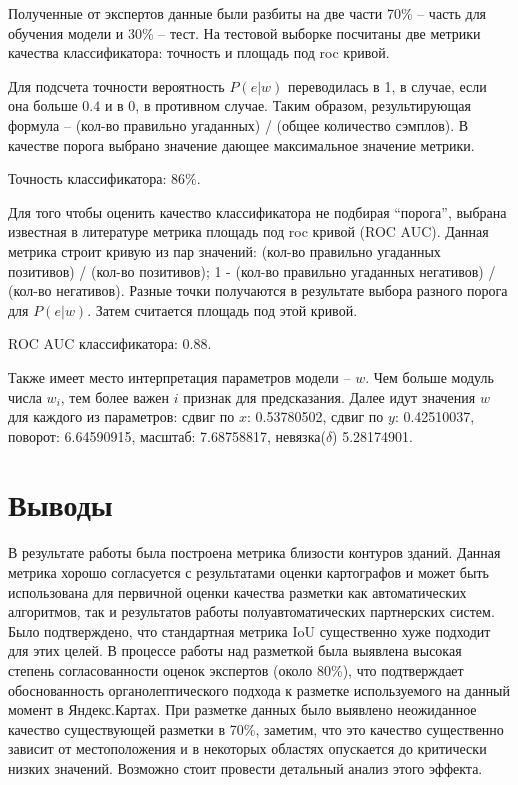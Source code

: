 \documentclass[12pt]{article}
\begin{document}
Полученные от экспертов данные были разбиты на две части 70\% -- часть для обучения модели и 30\% -- тест. На тестовой выборке посчитаны две метрики качества классификатора: точность и площадь под roc кривой.

Для подсчета точности вероятность $P(e | w)$ переводилась в 1, в случае, если она больше $0.4$ и в 0, в противном случае. Таким образом, результирующая формула -- (кол-во правильно угаданных) / (общее количество сэмплов). В качестве порога выбрано значение дающее максимальное значение метрики.

Точность классификатора: 86\%.

Для того чтобы оценить качество классификатора не подбирая ``порога'', выбрана известная в литературе метрика площадь под roc кривой (ROC AUC). Данная метрика строит кривую из пар значений: (кол-во правильно угаданных позитивов)  / (кол-во позитивов); 1 - (кол-во правильно угаданных негативов) / (кол-во негативов). Разные точки получаются в результате выбора разного порога для $P(e | w)$. Затем считается площадь под этой кривой.

ROC AUC классификатора: 0.88.

Также имеет место интерпретация параметров модели -- $w$. Чем больше модуль числа $w_i$, тем более важен $i$ признак для предсказания. Далее идут значения $w$ для каждого из параметров:
сдвиг по $x$: 0.53780502, сдвиг по $y$: 0.42510037, поворот: 6.64590915, масштаб: 7.68758817, невязка($\delta$) 5.28174901.

\section{Выводы}
\label{conclusions}
В результате работы была построена метрика близости контуров зданий. Данная метрика хорошо согласуется с результатами оценки картографов и может быть использована для первичной оценки качества разметки как автоматических алгоритмов, так и результатов работы полуавтоматических партнерских систем. Было подтверждено, что стандартная метрика IoU существенно хуже подходит для этих целей. В процессе работы над разметкой была выявлена высокая степень согласованности оценок экспертов (около 80\%), что подтверждает обоснованность органолептического подхода к разметке используемого на данный момент в Яндекс.Картах. При разметке данных было выявлено неожиданное качество существующей разметки в 70\%, заметим, что это качество существенно зависит от местоположения и в некоторых областях опускается до критически низких значений. Возможно стоит провести детальный анализ этого эффекта.
\end{document}
